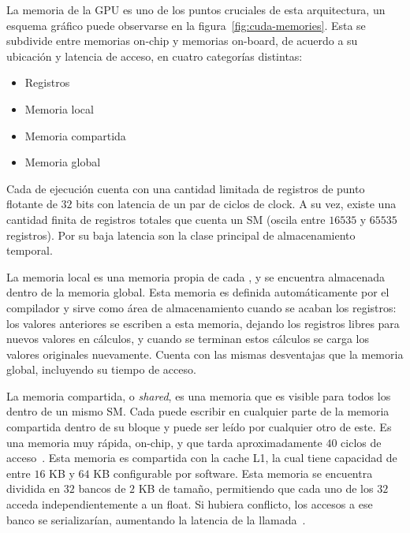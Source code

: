 La memoria de la GPU es uno de los puntos cruciales de esta arquitectura, un esquema gr\'afico puede observarse en la figura~\ref{fig:cuda-memories}.
Esta se subdivide entre memorias on-chip y memorias on-board, de acuerdo a su ubicaci\'on y latencia de acceso, en cuatro categor\'ias distintas:

\begin{itemize}
  \item Registros
  \item Memoria local
  \item Memoria compartida
  \item Memoria global
\end{itemize}

Cada \thread{} de ejecuci\'on cuenta con una cantidad limitada de registros de punto flotante de $32$ bits con latencia de un par de ciclos de clock.
A su vez, existe una cantidad finita de registros totales que cuenta un SM (oscila entre $16535$ y $65535$ registros).
Por su baja latencia son la clase principal de almacenamiento temporal.

La memoria local es una memoria propia de cada \thread{}, y se encuentra almacenada dentro de la memoria global.
Esta memoria es definida autom\'aticamente por el compilador y sirve como \'area de almacenamiento cuando se acaban los registros: los valores anteriores se escriben a esta memoria, dejando los registros libres para nuevos valores en c\'alculos, y cuando se terminan estos c\'alculos se carga los valores originales nuevamente.
Cuenta con las mismas desventajas que la memoria global, incluyendo su tiempo de acceso.

La memoria compartida, o \textit{shared}, es una memoria que es visible para todos los \threads{} dentro de un mismo SM.
Cada \thread{} puede escribir en cualquier parte de la memoria compartida dentro de su bloque y puede ser le\'ido por cualquier otro \thread{} de este.
Es una memoria muy r\'apida, on-chip, y que tarda aproximadamente $40$ ciclos de acceso~\cite{Demystifying}.
Esta memoria es compartida con la cache L1, la cual tiene capacidad de entre $16$ KB y $64$ KB configurable por software.
Esta memoria se encuentra dividida en $32$ bancos de $2$ KB de tama\~no, permitiendo que cada uno de los $32$ \threads{} acceda independientemente a un float.
Si hubiera conflicto, los accesos a ese banco se serializar\'ian, aumentando la latencia de la llamada~\cite{farberCuda}.


